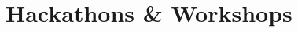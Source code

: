 \documentclass[a4paper,10pt]{extarticle} %
\begin{document}
\begin{tabular}{R{3.0cm}|p{15.0cm}}
\end{tabular}

\section{Hackathons \& Workshops}
\end{document}
